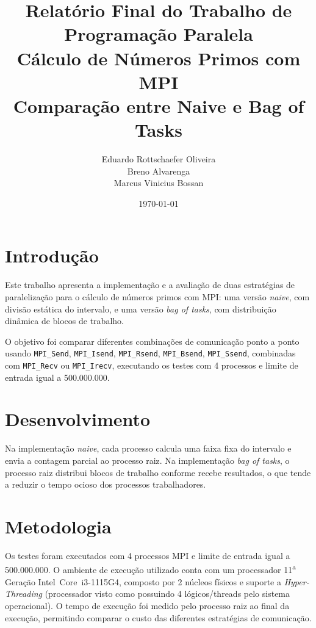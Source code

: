 \documentclass[12pt,a4paper]{article}
\begin{document}
\title{
    \textbf{Relatório Final do Trabalho de Programação Paralela} \\[0.5em]
    \large Cálculo de Números Primos com MPI \\[0.3em]
    \normalsize Comparação entre Naive e Bag of Tasks
}
\author{
    Eduardo Rottschaefer Oliveira \\
    Breno Alvarenga \\
    Marcus Vinicius Bossan \\
}
\date{\today}

\maketitle
\thispagestyle{empty}

\newpage
\tableofcontents
\newpage

\section{Introdução}
Este trabalho apresenta a implementação e a avaliação de duas estratégias de paralelização para o cálculo de números primos com MPI: uma versão \textit{naive}, com divisão estática do intervalo, e uma versão \textit{bag of tasks}, com distribuição dinâmica de blocos de trabalho.

O objetivo foi comparar diferentes combinações de comunicação ponto a ponto usando \texttt{MPI\_Send}, \texttt{MPI\_Isend}, \texttt{MPI\_Rsend}, \texttt{MPI\_Bsend}, \texttt{MPI\_Ssend}, combinadas com \texttt{MPI\_Recv} ou \texttt{MPI\_Irecv}, executando os testes com 4 processos e limite de entrada igual a 500.000.000.

\section{Desenvolvimento}

Na implementação \textit{naive}, cada processo calcula uma faixa fixa do intervalo e envia a contagem parcial ao processo raiz. Na implementação \textit{bag of tasks}, o processo raiz distribui blocos de trabalho conforme recebe resultados, o que tende a reduzir o tempo ocioso dos processos trabalhadores.

\section{Metodologia}
Os testes foram executados com 4 processos MPI e limite de entrada igual a 500.000.000. O ambiente de execução utilizado conta com um processador 11\textsuperscript{a} Geração Intel\textregistered\ Core\texttrademark\ i3-1115G4, composto por 2 núcleos físicos e suporte a \textit{Hyper-Threading} (processador visto como possuindo 4 lógicos/threads pelo sistema operacional). O tempo de execução foi medido pelo processo raiz ao final da execução, permitindo comparar o custo das diferentes estratégias de comunicação.
\end{document}
